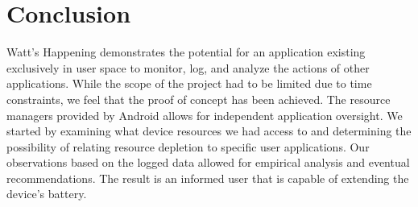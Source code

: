 \section*{Conclusion}
Watt's Happening demonstrates the potential for an application existing exclusively in user space to monitor, log, and analyze the actions of other applications.  
While the scope of the project had to be limited due to time constraints, we feel that the proof of concept has been achieved.  
The resource managers provided by Android allows for independent application oversight.
We started by examining what device resources we had access to and determining the possibility of 
relating resource depletion to specific user applications.  
Our observations based on the logged data allowed for empirical analysis and eventual recommendations.  
The result is an informed user that is capable of extending the device's battery.
